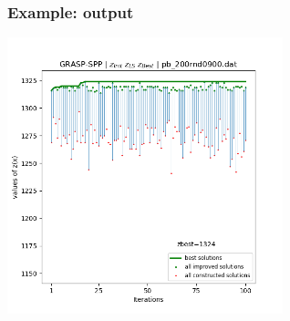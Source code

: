 \documentclass[]{beamer}
\begin{document}
% 
%
\begin{frame}
  \frametitle{Example: output}
  
      \vspace{0mm}
    \centerline{\includegraphics[height=8cm]{Traceofarun.png}}
    \vspace{5mm}
  
\end{frame}
\end{document}
